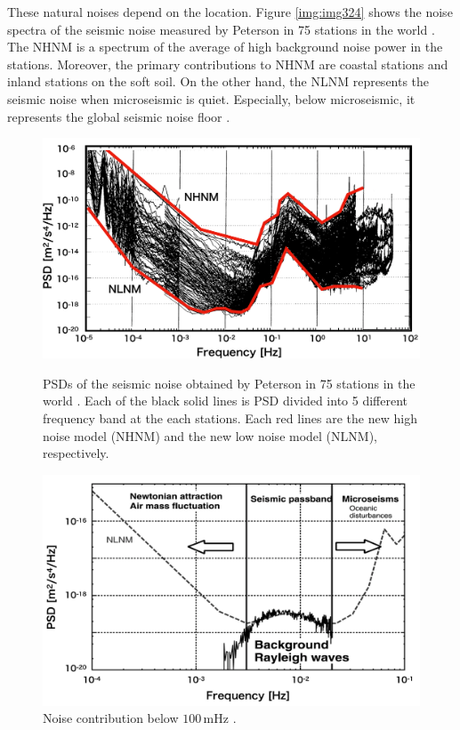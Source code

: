 These natural noises depend on the location. Figure \ref{img:img324} shows the noise spectra of the seismic noise measured by Peterson in 75 stations in the world \cite{peterson1993observations}. The NHNM is a spectrum of the average of high background noise power in the stations. Moreover, the primary contributions to NHNM are coastal stations and inland stations on the soft soil. On the other hand, the NLNM represents the seismic noise when microseismic is quiet. Especially, below microseismic, it represents the global seismic noise floor \cite{nishida2002origin}. 

\begin{figure}[p]
  \begin{center}   
    \includegraphics[width=12.5cm]{./img_chap3/img324.png}
    \caption{PSDs of the seismic noise obtained by Peterson in 75 stations in the world \cite{peterson1993observations}. Each of the black solid lines is PSD divided into 5 different frequency band at the each stations. Each red lines are the new high noise model (NHNM) and the new low noise model (NLNM), respectively.}\label{img:img324}
  \end{center}
  \begin{center}   
    \includegraphics[width=13cm]{./img_chap3/img325.png}
    \caption{Noise contribution below $100\,\mathrm{mHz}$ \cite{nishida2002origin}. }\label{img:img325}
  \end{center} 
\end{figure}


